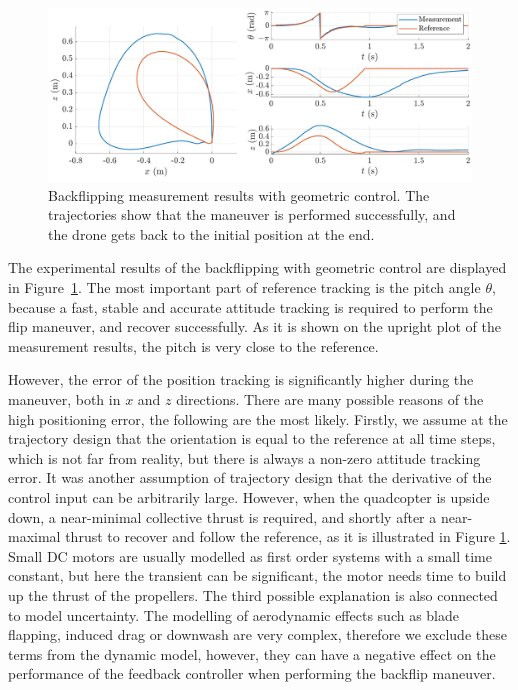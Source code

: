 \begin{figure}
\centering
\includegraphics[width=.8\linewidth]{Fig/geommeast2.pdf}
\caption[Backflipping measurement results with geometric control]{Backflipping measurement results with geometric control. The trajectories show that the maneuver is performed successfully, and the drone gets back to the initial position at the end.}\label{fig:geommeas}
\end{figure}

The experimental results of the backflipping with geometric control are displayed in Figure~\ref{fig:geommeas}. The most important part of reference tracking is the pitch angle $\theta$, because a fast, stable and accurate attitude tracking is required to perform the flip maneuver, and recover successfully. As it is shown on the upright plot of the measurement results, the pitch is very close to the reference. 

However, the error of the position tracking is significantly higher during the maneuver, both in $x$ and $z$ directions. There are many possible reasons of the high positioning error, the following are the most likely. Firstly, we assume at the trajectory design that the orientation is equal to the reference at all time steps, which is not far from reality, but there is always a non-zero attitude tracking error. It was another assumption of trajectory design that the derivative of the control input can be arbitrarily large. However, when the quadcopter is upside down, a near-minimal collective thrust is required, and shortly after a near-maximal thrust to recover and follow the reference, as it is illustrated in Figure \ref{fig:geommeas}. Small DC motors are usually modelled as first order systems with a small time constant, but here the transient can be significant, the motor needs time to build up the thrust of the propellers. The third possible explanation is also connected to model uncertainty. The modelling of aerodynamic effects such as blade flapping, induced drag or downwash \cite{quad_model} are very complex, therefore we exclude these terms from the dynamic model, however, they can have a negative effect on the performance of the feedback controller when performing the backflip maneuver.

